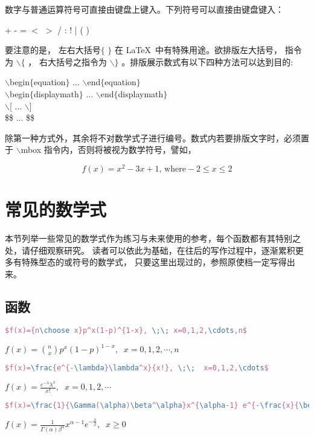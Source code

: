 数字与普通运算符号可直接由键盘上键入。下列符号可以直接由键盘键入：

        \begin{center}
                    + \;-\; =\; $<$\; $>$ \;/ \;:\; !\; | \;[\; ] \;(\; )\\
        \end{center}
		
要注意的是， 左右大括号$\{$ $\}$ 在 \LaTeX\ 中有特殊用途。欲排版左大括号， 指令为 $\backslash \{$ ，
右大括号之指令为 $\backslash \}$ 。排版展示数式有以下四种方法可以达到目的:
        \begin{center}
$\backslash$begin$\{$equation$\}$ ... $\backslash$end$\{$equation$\}$\\
$\backslash$begin$\{$displaymath$\}$ ... $\backslash$end$\{$displaymath$\}$\\
$\backslash$[ ... $\backslash$]\\
\$\$ ... \$\$
        \end{center}
除第一种方式外，其余将不对数学式子进行编号。数式内若要排版文字时，必须置于
$\backslash$mbox 指令内，否则将被视为数学符号，譬如，

$$f(x)=x^2-3x+1 \mbox{, where} -2 \leq x \leq 2$$
\section{常见的数学式}
本节列举一些常见的数学式作为练习与未来使用的参考，每个函数都有其特别之处，请仔细观察研究。
读者可以依此为基础，在往后的写作过程中，逐渐累积更多有特殊型态的或符号的数学式，
只要这里出现过的，参照原使档一定写得出来。

\subsection{函数}
    \begin{lstlisting}[language=TeX,numbers=none,frame=lrtb,keywords={begin},label=Binomial,caption=Binomial] 
  $f(x)={n\choose x}p^x(1-p)^{1-x}, \;\; x=0,1,2,\cdots,n$ 
  \end{lstlisting}
  $f(x)={n\choose x}p^x(1-p)^{1-x}, \;\; x=0,1,2,\cdots,n$ 
   
  \begin{lstlisting}[language=TeX,numbers=none,frame=lrtb,keywords={begin},label=Poisson,caption=Poisson] 
  $f(x)=\frac{e^{-\lambda}\lambda^x}{x!}, \;\;  x=0,1,2,\cdots$ 
  \end{lstlisting}
  $f(x)=\frac{e^{-\lambda}\lambda^x}{x!}, \;\;  x=0,1,2,\cdots$
  
  \begin{lstlisting}[language=TeX,numbers=none,frame=lrtb,keywords={begin},label=Gamma,caption=Gamma] 
  $f(x)=\frac{1}{\Gamma(\alpha)\beta^\alpha}x^{\alpha-1} e^{-\frac{x}{\beta}}, \;\; x\geq 0$
  \end{lstlisting}
  $f(x)=\frac{1}{\Gamma(\alpha)\beta^\alpha}x^{\alpha-1}e^{-\frac{x}{\beta}}, \;\; x\geq 0$ 
  
